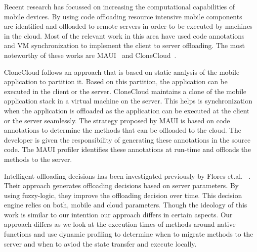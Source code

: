Recent research has focussed on increasing the computational capabilities of mobile devices. By using code offloading
resource intensive mobile components are identified and offloaded to remote servers in order to be executed
by machines in the cloud. Most of the relevant work in this area have used code annotations and VM synchronization to
implement the client to server offloading. The most noteworthy of these works are MAUI~\cite{maui} and CloneCloud~\cite{ccloud}.

CloneCloud follows an approach that is based on static analysis of the mobile application to partition it.
Based on this partition, the application can be executed in the client or the server. CloneCloud maintains
a clone of the mobile application stack in a virtual machine on the server. This helps is synchronization
when the application is offloaded as the application can be executed at the client or the server seamlessly.
The strategy proposed by MAUI is based on code annotations to determine the methods that can be offloaded to the
cloud. The developer is given the responsibility of generating these annotations in the source code. The MAUI
profiler identifies these annotations at run-time and offloads the methods to the server.

Intelligent offloading decisions has been investigated previously by Flores et.al. ~\cite{fuzzy}. Their approach
generates offloading decisions based on server parameters. By using fuzzy-logic, they improve the offloading decision
over time. This decision engine relies on both, mobile and cloud parameters. Though the ideology of this work is similar
to our intention our approach differs in certain aspects. Our approach differs as we look
at the execution times of methods around native functions and use dynamic profiling to determine when to migrate methods
to the server and when to aviod the state transfer and execute locally.

